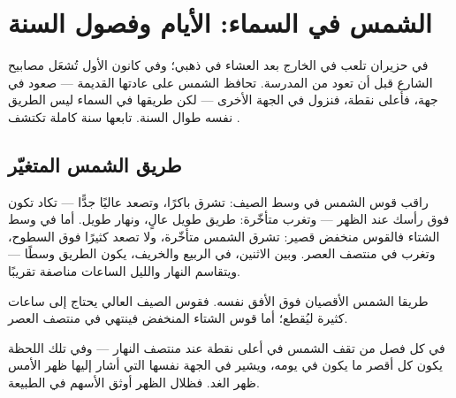 \chapter{الشمس في السماء: الأيام وفصول السنة}\label{ch:g3:sun-days-seasons}

في حزيران تلعب في الخارج بعد العشاء في  ذهبي؛ وفي كانون الأول
تُشعَل مصابيح الشارع قبل أن تعود من المدرسة. تحافظ الشمس على عادتها
القديمة --- صعود في جهة، فأعلى نقطة، فنزول في الجهة الأخرى ---
لكن طريقها في السماء ليس الطريق نفسه طوال السنة. تابعها سنة كاملة
تكتشف .

\section{طريق الشمس المتغيّر}

\begin{example}\label{ex:g3:sun-days-seasons:roads}
راقب قوس الشمس في وسط الصيف: تشرق باكرًا، وتصعد عاليًا جدًّا ---
تكاد تكون فوق رأسك عند الظهر --- وتغرب متأخّرة: طريق طويل عالٍ،
ونهار طويل. أما في وسط الشتاء فالقوس منخفض قصير: تشرق الشمس
متأخّرة، ولا تصعد كثيرًا فوق السطوح، وتغرب في منتصف العصر. وبين
الاثنين، في الربيع والخريف، يكون الطريق وسطًا --- ويتقاسم النهار
والليل الساعات مناصفة تقريبًا.
\end{example}

\begin{omfigure}

{\small طريقا الشمس الأقصيان فوق الأفق نفسه. فقوس الصيف العالي
يحتاج إلى ساعات كثيرة ليُقطع؛ أما قوس الشتاء المنخفض فينتهي في
منتصف العصر.}
\end{omfigure}

\begin{proposition}\label{prop:g3:sun-days-seasons:midday}
في كل فصل من  تقف الشمس في أعلى نقطة عند منتصف النهار
--- وفي تلك اللحظة يكون كل  أقصر ما يكون في يومه، ويشير في
الجهة نفسها التي أشار إليها  ظهر الأمس  ظهر الغد. فظلال
الظهر أوثق الأسهم في الطبيعة.
\end{proposition}

